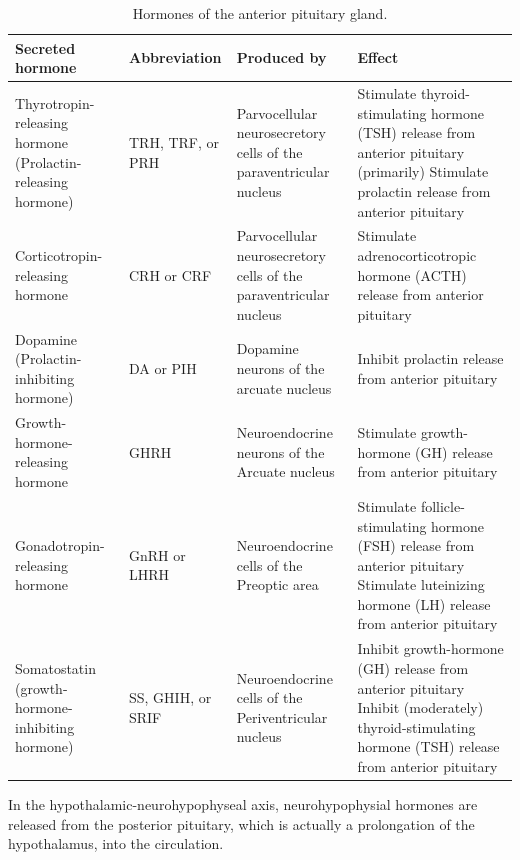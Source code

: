 \onecolumn
\begin{table}

\caption{\label{tab:anteriorpituitaryhormones}Hormones of the anterior pituitary gland.}
\centering
\begin{tabular}[t]{>{\raggedright\arraybackslash}p{15em}>{\raggedright\arraybackslash}p{5em}>{\raggedright\arraybackslash}p{15em}>{\raggedright\arraybackslash}p{20em}}
\toprule
Secreted hormone & Abbreviation & Produced by & Effect\\
\midrule
\rowcolor{gray!6}  Thyrotropin-releasing hormone (Prolactin-releasing hormone) & TRH, TRF, or PRH & Parvocellular neurosecretory cells of the paraventricular nucleus & Stimulate thyroid-stimulating hormone (TSH) release from anterior pituitary (primarily) Stimulate prolactin release from anterior pituitary\\
Corticotropin-releasing hormone & CRH or CRF & Parvocellular neurosecretory cells of the paraventricular nucleus & Stimulate adrenocorticotropic hormone (ACTH) release from anterior pituitary\\
\rowcolor{gray!6}  Dopamine (Prolactin-inhibiting hormone) & DA or PIH & Dopamine neurons of the arcuate nucleus & Inhibit prolactin release from anterior pituitary\\
Growth-hormone-releasing hormone & GHRH & Neuroendocrine neurons of the Arcuate nucleus & Stimulate growth-hormone (GH) release from anterior pituitary\\
\rowcolor{gray!6}  Gonadotropin-releasing hormone & GnRH or LHRH & Neuroendocrine cells of the Preoptic area & Stimulate follicle-stimulating hormone (FSH) release from anterior pituitary Stimulate luteinizing hormone (LH) release from anterior pituitary\\
\addlinespace
Somatostatin (growth-hormone-inhibiting hormone) & SS, GHIH, or SRIF & Neuroendocrine cells of the Periventricular nucleus & Inhibit growth-hormone (GH) release from anterior pituitary Inhibit (moderately) thyroid-stimulating hormone (TSH) release from anterior pituitary\\
\bottomrule
\end{tabular}
\end{table}

\twocolumn

In the hypothalamic-neurohypophyseal axis, neurohypophysial hormones are released from the posterior pituitary, which is actually a prolongation of the hypothalamus, into the circulation.

\onecolumn

